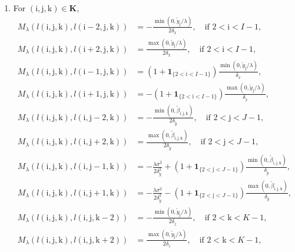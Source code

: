 \documentclass[12pt]{article}
\numberwithin{equation}{section}
\newcommand{\indic}{\mathbf{1}}
\newcommand{\ri}{\mathrm{i}}
\newcommand{\rj}{\mathrm{j}}
\newcommand{\rk}{\mathrm{k}}
\begin{document}
\vspace{0.5em}
\begin{enumerate}[label = (\arabic*)]
	\setlength{\itemsep}{4pt}
	\item For $(\ri,\rj,\rk) \in \bm{K}$, 
	\begin{align}
		M_{\lambda}(l(\ri,\rj,\rk), l(\ri -2,\rj,\rk)) 
		&= -\frac{\min(0,\tilde{y}_{\rj}/\lambda)}{2\delta_{\tilde{x}}}, \quad \text{if~}2<\ri < I-1, \label{2order-i1}\\
		M_{\lambda}(l(\ri,\rj,\rk), l(\ri +2,\rj,\rk)) 
		&= \frac{\max(0,\tilde{y}_{\rj}/\lambda)}{2\delta_{\tilde{x}}}, \quad \text{if~}2<\ri < I-1, \label{2order-i2}\\
		M_{\lambda}(l(\ri,\rj,\rk), l(\ri -1,\rj,\rk)) 
		&= (1 + \indic_{\{2< \ri < I-1\}})\frac{\min(0,\tilde{y}_{\rj}/\lambda)}{\delta_{\tilde{x}}}, \label{2order-i3}\\
		M_{\lambda}(l(\ri,\rj,\rk), l(\ri +1,\rj,\rk)) 
		&= -(1 + \indic_{\{2< \ri < I-1\}})\frac{\max(0,\tilde{y}_{\rj}/\lambda)}{\delta_{\tilde{x}}}, \label{2order-i4}\\
		M_{\lambda}(l(\ri,\rj,\rk), l(\ri ,\rj-2,\rk)) 
		&= -\frac{\min(0,\tilde{\beta}_{\ri,\rj,\rk})}{2\delta_{\tilde{y}}},\quad \text{if~}2<\rj < J-1, \label{2order-j1}\\
		M_{\lambda}(l(\ri,\rj,\rk), l(\ri ,\rj+2,\rk)) 
		&= \frac{\max(0, \tilde{\beta}_{\ri,\rj,\rk})}{2\delta_{\tilde{y}}}, \quad \text{if~}2<\rj < J-1, \label{2order-j2}\\
		M_{\lambda}(l(\ri,\rj,\rk), l(\ri ,\rj-1,\rk)) 
		&= - \frac{\lambda\sigma^{2}}{2\delta_{\tilde{y}}^{2}} + (1 + \indic_{\{2< \rj < J-1\}})\frac{\min(0,\tilde{\beta}_{\ri,\rj,\rk})}{\delta_{\tilde{y}}}, \label{2order-j3}\\
		M_{\lambda}(l(\ri,\rj,\rk), l(\ri ,\rj+1,\rk)) 
		&= - \frac{\lambda\sigma^{2}}{2\delta_{\tilde{y}}^{2}} - (1 + \indic_{\{2< \rj < J-1\}})\frac{\max(0,\tilde{\beta}_{\ri,\rj,\rk})}{\delta_{\tilde{y}}},\label{2order-j4}\\
		M_{\lambda}(l(\ri,\rj,\rk), l(\ri,\rj,\rk -2)) 
		&= -\frac{ \min(0,\tilde{y}_{\rj}/\lambda)}{2\delta_{\tilde{z}}}, \quad \text{if~}2<\rk < K-1, \label{2order-k1}\\
		M_{\lambda}(l(\ri,\rj,\rk), l(\ri,\rj,\rk + 2)) 
		&= \frac{ \max(0,\tilde{y}_{\rj}/\lambda)}{2\delta_{\tilde{z}}}, \quad \text{if~}2<\rk < K-1, \label{2order-k2}\\

\end{align}
\end{enumerate}
\end{document}

